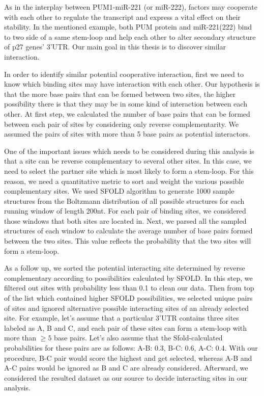 As in the interplay between PUM1-miR-221 (or miR-222), factors may cooperate with each other to regulate the transcript and express a vital effect on their stability. In the mentioned example, both PUM protein and miR-221(222) bind to two side of a same stem-loop and help each other to alter secondary structure of p27 genes' 3'UTR. Our main goal in this thesis is to discover similar interaction.

In order to identify similar potential cooperative interaction, first we need to know which binding sites may have interaction with each other. Our hypothesis is that the more base pairs that can be formed between two sites, the higher possibility there is that they may be in some kind of interaction between each other. At first step, we calculated the number of base pairs that can be formed between each pair of sites by considering only reverse complementarity. We assumed the pairs of sites with more than 5 base pairs as potential interactors.

One of the important issues which needs to be considered during this analysis is that a site can be reverse complementary to several other sites. In this case, we need to select the partner site which is most likely to form a stem-loop. For this reason, we need a quantitative metric to sort and weight the various possible complementary sites. We used SFOLD algorithm to generate 1000 sample structures from the Boltzmann distribution of all possible structures for each running window of length 200nt. For each pair of binding sites, we considered those windows that both sites are located in. Next, we parsed all the sampled structures of each window to calculate the average number of base pairs formed between the two sites. This value reflects the probability that the two sites will form a stem-loop.

As a follow up, we sorted the potential interacting site determined by reverse complementary according to possibilities calculated by SFOLD. In this step, we filtered out sites with probability less than 0.1 to clean our data. Then from top of the list which contained higher SFOLD possibilities, we selected unique pairs of sites and ignored alternative possible interacting sites of an already selected site. For example, let's assume that a particular 3'UTR contains three sites labeled as A, B and C, and each pair of these sites can form a stem-loop with more than $\geq 5$ base pairs. Let's also assume that the Sfold-calculated probabilities for these pairs are as follows: A-B: 0.3, B-C: 0.6, A-C: 0.4. With our procedure, B-C pair would score the highest and get selected, whereas A-B and A-C pairs would be ignored as B and C are already considered. Afterward, we considered the resulted dataset as our source to decide interacting sites in our analysis.

